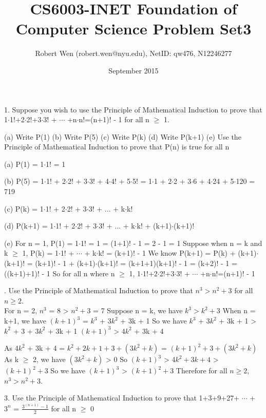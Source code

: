 \documentclass{article}
\title{CS6003-INET Foundation of Computer Science Problem Set3}
\author{Robert Wen (robert.wen@nyu.edu), NetID: qw476, N12246277}
\date{September 2015}
\begin{document}
\begin{large}

\maketitle


1. Suppose you wish to use the Principle of Mathematical Induction to prove that
1$\cdot$1!+2$\cdot$2!+3$\cdot$3! + $\cdots$ +n$\cdot$n!=(n+1)! - 1 for all n $\ge$ 1.

(a) Write P(1) (b) Write P(5) (c) Write P(k) (d) Write P(k+1) (e) Use the Principle of Mathematical Induction to prove that P(n) is true for all n

(a) P(1) = 1$\cdot$1! = 1

(b) P(5) = 1$\cdot$1! + 2$\cdot$2! + 3$\cdot$3! + 4$\cdot$4! + 5$\cdot$5!
         = 1$\cdot$1  + 2$\cdot$2  + 3$\cdot$6  + 4$\cdot$24 + 5$\cdot$120
         = 719

(c) P(k) = 1$\cdot$1! + 2$\cdot$2! + 3$\cdot$3! + ... + k$\cdot$k!

(d) P(k+1) = 1$\cdot$1! + 2$\cdot$2! + 3$\cdot$3! + ... + k$\cdot$k! + (k+1)$\cdot$(k+1)!

(e) For n = 1, P(1) = 1$\cdot$1! = 1 = (1+1)! - 1 = 2 - 1 = 1
\indent    Suppose when n = k and k $\ge$ 1, P(k) = 1$\cdot$1! + $\cdots$ + k$\cdot$k! = (k+1)! - 1
\indent    We know P(k+1) = P(k) + (k+1)$\cdot$(k+1)! 
\indent \indent           = (k+1)! - 1 + (k+1)$\cdot$(k+1)!
\indent \indent           = (k+1+1)(k+1)! - 1
\indent \indent           = (k+2)! - 1
\indent \indent           = ((k+1)+1)! - 1
\indent    So for all n where n $\ge$ 1, 1$\cdot$1!+2$\cdot$2!+3$\cdot$3! + $\cdots$ +n$\cdot$n!=(n+1)! - 1

. Use the Principle of Mathematical Induction to prove that $n^{3}>n^{2}+3$ for all $n\ge 2$. \\

For n = 2, $n^3$ = 8 > $n^{2} + 3$ = 7
Suppose n = k, we have $k^{3} > k^{2} + 3$
When n = k+1, we have $(k+1)^3$ = $k^3$ + 3$k^2$ + 3k + 1
So we have $k^{3}$ + 3$k^2$ + 3k + 1 > $k^{2}$ + 3 + 3$k^2$ + 3k + 1
           $(k+1)^3$ > 4$k^2$ + 3k + 4

As 4$k^2$ + 3k + 4 = $k^2 + 2k + 1 + 3 + (3k^2 + k)$
                   = $(k+1)^2 + 3 + (3k^2 + k)$
As k $\ge$ 2, we have $(3k^2 + k)$ > 0
So $(k+1)^3$ > 4$k^2 + 3k + 4$ > $(k+1)^2 + 3$
So we have $(k+1)^3$ > $(k+1)^2 + 3$
Therefore for all $n\ge 2$, $n^{3}>n^{2}+3$.

3. Use the Principle of Mathematical Induction to prove that 1+3+9+27+ $\cdots$ + $3^n$ = $\frac{3^(n+1)-1}{2}$ for all n $\ge$ 0


\end{large}
\end{document}
